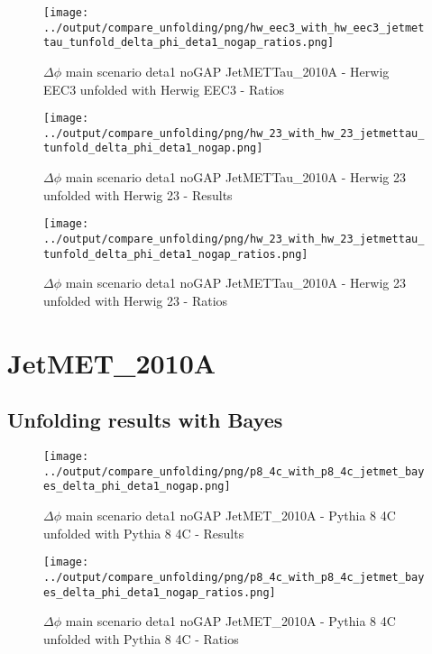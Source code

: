 \documentclass[11pt]{book}
\begin{document}
\begin{figure}[ht]
\centering
\texttt{[image: ../output/compare\_unfolding/png/hw\_eec3\_with\_hw\_eec3\_jetmettau\_tunfold\_delta\_phi\_deta1\_nogap\_ratios.png]}
\caption{$\Delta\phi$ main scenario deta1 noGAP JetMETTau\_2010A - Herwig EEC3 unfolded with Herwig EEC3 - Ratios}
\label{hw_eec3_hw_eec3_jetmettau_tunfold_delta_phi_deta1_nogap_b}
\end{figure}

\begin{figure}[ht]
\centering
\texttt{[image: ../output/compare\_unfolding/png/hw\_23\_with\_hw\_23\_jetmettau\_tunfold\_delta\_phi\_deta1\_nogap.png]}
\caption{$\Delta\phi$ main scenario deta1 noGAP JetMETTau\_2010A - Herwig 23 unfolded with Herwig 23 - Results}
\label{hw_23_hw_23_jetmettau_tunfold_delta_phi_deta1_nogap_a}
\end{figure}

\begin{figure}[ht]
\centering
\texttt{[image: ../output/compare\_unfolding/png/hw\_23\_with\_hw\_23\_jetmettau\_tunfold\_delta\_phi\_deta1\_nogap\_ratios.png]}
\caption{$\Delta\phi$ main scenario deta1 noGAP JetMETTau\_2010A - Herwig 23 unfolded with Herwig 23 - Ratios}
\label{hw_23_hw_23_jetmettau_tunfold_delta_phi_deta1_nogap_b}
\end{figure}


\clearpage
\section{JetMET\_2010A}
\subsection{Unfolding results with Bayes}

\begin{figure}[ht]
\centering
\texttt{[image: ../output/compare\_unfolding/png/p8\_4c\_with\_p8\_4c\_jetmet\_bayes\_delta\_phi\_deta1\_nogap.png]}
\caption{$\Delta\phi$ main scenario deta1 noGAP JetMET\_2010A - Pythia 8 4C unfolded with Pythia 8 4C - Results}
\label{p8_p8_jetmet_bayes_delta_phi_deta1_nogap_a}
\end{figure}

\begin{figure}[ht]
\centering
\texttt{[image: ../output/compare\_unfolding/png/p8\_4c\_with\_p8\_4c\_jetmet\_bayes\_delta\_phi\_deta1\_nogap\_ratios.png]}
\caption{$\Delta\phi$ main scenario deta1 noGAP JetMET\_2010A - Pythia 8 4C unfolded with Pythia 8 4C - Ratios}
\label{p8_p8_jetmet_bayes_delta_phi_deta1_nogap_b}
\end{figure}
\end{document}
